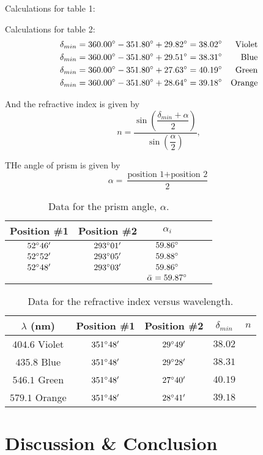 \documentclass[10pt]{article}
\begin{document}
Calculations for table 1:


Calculations for table 2:
\begin{align}
    \delta_{min} &= 360.00\degree-351.80\degree+29.82\degree = 38.02\degree & \text{Violet} \\
    \delta_{min} &= 360.00\degree-351.80\degree+29.51\degree = 38.31\degree & \text{Blue} \\
    \delta_{min} &= 360.00\degree-351.80\degree+27.63\degree = 40.19\degree & \text{Green} \\
    \delta_{min} &= 360.00\degree-351.80\degree+28.64\degree = 39.18\degree & \text{Orange}
\end{align}

And the refractive index is given by
\begin{equation}
    n = \dfrac{\sin\left(\dfrac{\delta_{min}+\alpha}{2}\right)}{\sin\left(\dfrac{\alpha}{2}\right)},
\end{equation}


THe angle of prism is given by
\begin{equation}
    \alpha = \dfrac{\text{position 1}+\text{position 2}}{2}
\end{equation}

\begin{table}[ht]
    \centering
    \begin{tabular}{|c|c|c|c|c|}
        \hline 
        Position \#1 & Position \#2 & $\alpha_i$ \\
        \hline
        $52\degree 46'$ & $293\degree 01'$ & $59.86\degree$ \\
        \hline
        $52\degree 52'$ & $293\degree 05'$ & $59.88\degree$ \\
        \hline
        $52\degree 48'$ & $293\degree 03'$ & $59.86\degree$ \\
        \hline
        & & $\bar{\alpha} = 59.87\degree$ \\
        \hline
    \end{tabular}
    \caption{Data for the prism angle, $\alpha$.}
    \label{tab:1}
\end{table}



\begin{table}[ht]
    \centering
    \begin{tabular}{|c|c|c|c|c|}
        \hline
        $\lambda$ (nm) & Position \#1 & Position \#2 & $\delta_{min}$ & $n$ \\
        \hline
        $404.6$ Violet & $351\degree 48'$ & $29\degree 49'$ & $38.02$ & \\
        \hline
        $435.8$ Blue & $351\degree 48'$ & $29\degree 28'$ & $38.31$ & \\
        \hline
        $546.1$ Green & $351\degree 48'$ & $27\degree 40'$ & $40.19$ & \\
        \hline
        $579.1$ Orange & $351\degree 48'$ & $28\degree 41'$ & $39.18$ & \\
        \hline
    \end{tabular}
    \caption{Data for the refractive index versus wavelength.}
    \label{tab:2}
\end{table}



\section{Discussion \& Conclusion}

\printbibliography
\end{document}
